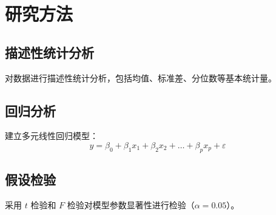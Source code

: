 \section{研究方法}

\subsection{描述性统计分析}

对数据进行描述性统计分析，包括均值、标准差、分位数等基本统计量。

\subsection{回归分析}

建立多元线性回归模型：
\[
  y = \beta_0 + \beta_1 x_1 + \beta_2 x_2 + \dots + \beta_p x_p + \varepsilon
\]

\subsection{假设检验}

采用 $t$ 检验和 $F$ 检验对模型参数显著性进行检验（$\alpha = 0.05$）。
